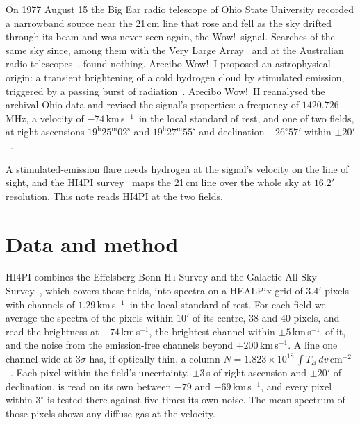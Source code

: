 \documentclass[3p,11pt]{elsarticle}
\newcommand{\kms}{km\,s$^{-1}$}
\begin{document}
On 1977 August 15 the Big Ear radio telescope of Ohio State University recorded a
narrowband source near the 21\,cm line that rose and fell as the sky drifted through its
beam and was never seen again, the Wow!\ signal. Searches of the same sky since, among
them with the Very Large Array~\cite{GrayMarvel2001} and at the Australian
radio telescopes~\cite{GrayEllingsen2002}, found nothing. Arecibo Wow!~I proposed an
astrophysical origin: a transient brightening of a cold hydrogen cloud by stimulated
emission, triggered by a passing burst of radiation~\cite{Mendez2024}. Arecibo Wow!~II
reanalysed the archival Ohio data and revised the signal's properties: a frequency of
$1420.726$\,MHz, a velocity of $-74$\,\kms\ in the local standard of rest, and one of two
fields, at right ascensions $19^\mathrm{h}25^\mathrm{m}02^\mathrm{s}$ and
$19^\mathrm{h}27^\mathrm{m}55^\mathrm{s}$ and declination $-26^\circ57'$ within
$\pm20'$~\cite{Mendez2025}.

A stimulated-emission flare needs hydrogen at the signal's velocity on the line of
sight, and the HI4PI survey~\cite{HI4PI2016} maps the 21\,cm line over the whole sky at
$16.2'$ resolution. This note reads HI4PI at the two fields.

\section{Data and method}\label{sec:method}

HI4PI combines the Effelsberg-Bonn H\,\textsc{i} Survey and the Galactic All-Sky
Survey~\cite{McClureGriffiths2009}, which covers these fields, into spectra on a HEALPix
grid of $3.4'$ pixels with channels of $1.29$\,\kms\ in the local standard of rest. For
each field we average the spectra of the pixels within $10'$ of its centre, $38$ and
$40$ pixels, and read the brightness at $-74$\,\kms, the brightest channel within
$\pm5$\,\kms\ of it, and the noise from the emission-free channels beyond
$\pm200$\,\kms. A line one channel wide at $3\sigma$ has, if optically thin, a column
$N=1.823\times10^{18}\,\int T_B\,dv$\,cm$^{-2}$~\cite{DickeyLockman1990}. Each pixel
within the field's uncertainty, $\pm3$\,s of right ascension and $\pm20'$ of
declination, is read on its own between $-79$ and $-69$\,\kms, and every pixel within
$3^\circ$ is tested there against five times its own noise. The mean spectrum of those
pixels shows any diffuse gas at the velocity.
\end{document}
